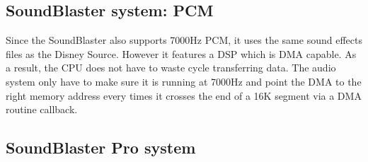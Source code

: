 \par
\subsection{SoundBlaster system: PCM}
Since the SoundBlaster also supports 7000Hz PCM, it uses the same sound effects files as the Disney Source. However it features a DSP which is DMA capable. As a result, the CPU does not have to waste cycle transferring data. The audio system only have to make sure it is running at 7000Hz and point the DMA to the right memory address every times it crosses the end of a 16K segment via a DMA routine callback.
\par








\par
\subsection{SoundBlaster Pro system}
\par

